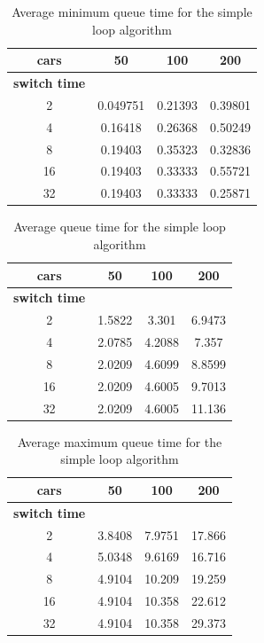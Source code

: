 \documentclass[a4paper,11pt]{article}
\begin{document}
\begin{table}[htb]
\centering
\begin{tabular}{cccc}
\hline
\textbf{cars} & 50 & 100 & 200\\
\hline
\textbf{switch time} & & & \\
2 & 0.049751 & 0.21393 & 0.39801 \\
4 & 0.16418 & 0.26368 & 0.50249 \\
8 & 0.19403 & 0.35323 & 0.32836 \\
16 & 0.19403 & 0.33333 & 0.55721 \\
32 & 0.19403 & 0.33333 & 0.25871 \\
\hline
\end{tabular}
\label{tab:simpleloopmintime}
\caption{Average minimum queue time for the simple loop algorithm}
\end{table}

\begin{table}[htb]
\centering
\begin{tabular}{cccc}
\hline
\textbf{cars} & 50 & 100 & 200\\
\hline
\textbf{switch time} & & & \\
2 & 1.5822 & 3.301 & 6.9473 \\
4 & 2.0785 & 4.2088 & 7.357 \\
8 & 2.0209 & 4.6099 & 8.8599 \\
16 & 2.0209 & 4.6005 & 9.7013 \\
32 & 2.0209 & 4.6005 & 11.136 \\
\hline
\end{tabular}
\label{tab:simpleloopavgtime}
\caption{Average queue time for the simple loop algorithm}
\end{table}

\begin{table}[htb]
\centering
\begin{tabular}{cccc}
\hline
\textbf{cars} & 50 & 100 & 200\\
\hline
\textbf{switch time} & & & \\
2 & 3.8408 & 7.9751 & 17.866 \\
4 & 5.0348 & 9.6169 & 16.716 \\
8 & 4.9104 & 10.209 & 19.259 \\
16 & 4.9104 & 10.358 & 22.612 \\
32 & 4.9104 & 10.358 & 29.373 \\
\hline
\end{tabular}
\label{tab:simpleloopmaxtime}
\caption{Average maximum queue time for the simple loop algorithm}
\end{table}
\end{document}
